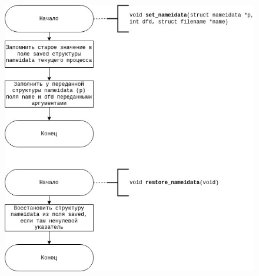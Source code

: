 \documentclass[a4paper,14pt]{extreport}
\begin{document}
\begin{figure}[H]
	\centering
	\includegraphics[scale=0.9]{img/nameidata.jpg}
	\label{fig:nameidata}
\end{figure}

	
\end{document}
